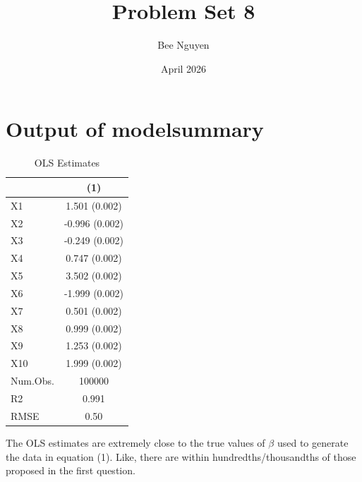 \documentclass{article}
\title{Problem Set 8}
\author{Bee Nguyen}
\date{April 2026}
\begin{document}
\maketitle

\section{Output of modelsummary}

\begin{table}[h]
\centering
\begin{tabular}{lc}
\toprule
 & (1) \\
\midrule
X1  & 1.501 (0.002) \\
X2  & -0.996 (0.002) \\
X3  & -0.249 (0.002) \\
X4  & 0.747 (0.002) \\
X5  & 3.502 (0.002) \\
X6  & -1.999 (0.002) \\
X7  & 0.501 (0.002) \\
X8  & 0.999 (0.002) \\
X9  & 1.253 (0.002) \\
X10 & 1.999 (0.002) \\
\midrule
Num.Obs. & 100000 \\
R2       & 0.991 \\
RMSE     & 0.50 \\
\bottomrule
\end{tabular}
\caption{OLS Estimates}
\end{table}

The OLS estimates are extremely close to the true values of $\beta$ used to generate the data in equation (1). Like, there are within hundredths/thousandths of those proposed in the first question. 
\end{document}
